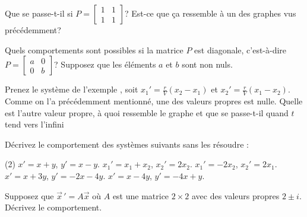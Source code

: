 \begin{exercise}
Que se passe-t-il si $P = 
\left[ \begin{smallmatrix} 1 & 1 \\ 1 & 1 \end{smallmatrix} \right]$?
Est-ce que ça ressemble à un des graphes vus précédemment?
\end{exercise}

\begin{exercise}
Quels comportements sont possibles si la matrice $P$ est diagonale, c'est-à-dire
$P = \left[ \begin{smallmatrix} a & 0 \\ 0 & b \end{smallmatrix} \right]$?
Supposez que les éléments $a$ et $b$ sont non nuls.
\end{exercise}

\begin{exercise}
Prenez le système de l'exemple , soit
$x_1'=\frac{r}{V}(x_2-x_1)$ et
$x_2'=\frac{r}{V}(x_1-x_2)$.
Comme on l'a précédemment mentionné, une des valeurs propres est nulle. Quelle est l'autre valeur propre, à quoi ressemble le graphe et que se passe-t-il quand $t$ tend vers l'infini\end{exercise}

\setcounter{exercise}{100}

\begin{exercise}
Décrivez le comportement des systèmes suivants sans les résoudre :
\begin{tasks}(2)
\task $x' = x + y$, \quad $y' = x-y$.
\task $x_1' = x_1 + x_2$, \quad $x_2' = 2 x_2$.
\task $x_1' = -2x_2$, \quad $x_2' = 2 x_1$.
\task $x' = x + 3y$, \quad $y' = -2x-4y$.
\task $x' = x - 4y$, \quad $y' = -4x+y$.
\end{tasks}
\end{exercise}

\begin{exercise}
Supposez que $\vec{x}\,' = A \vec{x}$ où $A$ est une matrice $2 \times 2$ avec des valeurs propres $2\pm i$. Décrivez le comportement.
\end{exercise}

